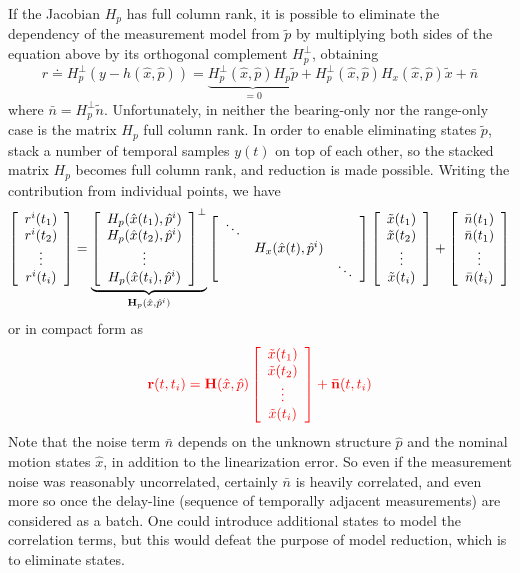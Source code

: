 \documentclass[]{article}
\newcommand{\ba}{\left[ \begin{array}}
\newcommand{\ea}{\end{array} \right]}
\begin{document}
If the Jacobian $H_p$ has full column rank, it is possible to eliminate the dependency of the measurement model from $\tilde p$ by multiplying both sides of the equation above by its orthogonal complement $H_p^\perp$, obtaining
\begin{equation}
r \doteq H^\perp_p(y - h(\hat x, \hat p)) = \underbrace{H^\perp_p(\hat x, \hat p) H_p \tilde p}_{= 0} + H^\perp_p(\hat x, \hat p) H_x(\hat x, \hat p)\tilde x + \bar n
\end{equation}
where $\bar n = H_p^\perp \tilde n$. Unfortunately, in neither the bearing-only nor the range-only case is the matrix $H_p$ full column rank. In order to enable eliminating states $\tilde p$, \cite{mourikisR07} stack a number of temporal samples $y(t)$ on top of each other, so the stacked matrix $H_p$ becomes full column rank, and reduction is made possible. Writing the contribution from individual points, we have 
\begin{equation}
\ba{c} r^i(t_1) \\ r^i(t_2) \\ \vdots \\ r^i(t_i) \ea = 
 \underbrace{\ba{c}
H_p(\hat x(t_1), {\hat p}^i) \\ H_p(\hat x(t_2), {\hat p}^i)\\
\vdots \\ H_p(\hat x(t_i), {\hat p}^i)\ea^\perp}_{{\bf H}_p(\hat x, {\hat p}^i)}
\ba{ccc}
\ddots & & \\
 & H_x(\hat x(t), {\hat p}^i) &\\
 & & \ddots 
\ea\ba{c}
\tilde x(t_1) \\ \tilde x(t_2) \\ \vdots \\ \tilde x(t_i) \ea
+ \ba{c} \bar  n(t_1) \\ \bar n(t_1) \\ \vdots \\ \bar n(t_i) \ea
\end{equation}
or in compact form as
\begin{equation}
{\color{red}
{\bf r}(t,t_i) = {\bf H}(\hat x, \hat p) \ba{c}
\tilde x(t_1) \\ \tilde x(t_2) \\ \vdots \\ \tilde x(t_i) \ea + 
{\bf {\bar n}}(t,t_i)
}
\label{eq-approx-red}
\end{equation}
Note that the noise term $\bar n$ depends on the unknown structure $\hat p$ and the nominal motion states $\hat x$, in addition to the linearization error. So even if the measurement noise was reasonably uncorrelated, certainly $\bar n$ is heavily correlated, and even more so once the delay-line (sequence of temporally adjacent measurements) are considered as a batch. One could introduce additional states to model the correlation terms, but this would defeat the purpose of model reduction, which is to eliminate states.
\end{document}
